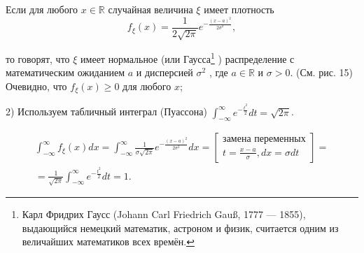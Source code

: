 \begin{definition}
Если для любого $x \in \mathbb{R}$ случайная величина $\xi$ имеет плотность
\begin{equation*}
	f_{\xi}(x) = \frac{1}{2 \sqrt{2\pi}}e^{-\frac{(x-a)^2}{2\sigma^2}},
\end{equation*}

то говорят, что $\xi$ имеет нормальное (или Гаусса\footnote{
Карл Фридрих Гаусс (Johann Carl Friedrich Gauß, 1777 — 1855), выдающийся немецкий математик,
астроном и физик, считается одним из величайших математиков всех времён.	
} 
) распределение с математическим ожиданием $a$ и дисперсией $\sigma^2$ , где $a \in \mathbb{R}$ и $\sigma > 0$. (См. рис. 15) Очевидно, что $f_{\xi}(x) \geq 0$ для любого $x$;

2) Используем табличный интеграл (Пуассона)
$\int_{-\infty}^{\infty}e^{-\frac{t^2}{2}}dt=\sqrt{2\pi}$.

\begin{gather*}
	\int_{-\infty}^{\infty} f_{\xi}(x)dx = \int_{-\infty}^{\infty} \frac{1}{\sigma \sqrt{2\pi}}e^{-\frac{(x-a)^2}{2\sigma^2}}dx =
	\left[
	\begin{aligned}
		\text{замена переменных}\\
		t = \frac{x-a}{\sigma}, dx = \sigma dt
	\end{aligned}\right]=\\=
	\frac{1}{\sqrt{2\pi}}\int_{-\infty}^{\infty}e^{-\frac{t^2}{2}}dt=1.
\end{gather*}
\end{definition}

